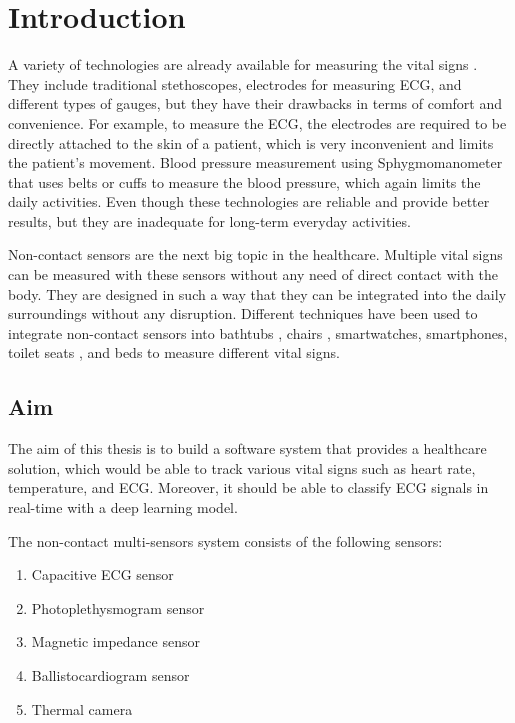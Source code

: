 \chapter{Introduction}

A variety of technologies are already available for measuring the vital signs \cite{naturectlesshcs}. They include traditional stethoscopes, electrodes for measuring ECG, and different types of gauges, but they have their drawbacks in terms of comfort and convenience. For example, to measure the ECG, the electrodes are required to be directly attached to the skin of a patient, which is very inconvenient and limits the patient's movement. Blood pressure measurement using Sphygmomanometer that uses belts or cuffs to measure the blood pressure, which again limits the daily activities. Even though these technologies are reliable and provide better results, but they are inadequate for long-term everyday activities.

Non-contact sensors are the next big topic in the healthcare. Multiple vital signs can be measured with these sensors without any need of direct contact with the body. They are designed in such a way that they can be integrated into the daily surroundings without any disruption. Different techniques have been used to integrate non-contact sensors into bathtubs \cite{lim2004ecg}, chairs \cite{aleksandrowicz2007wireless}, smartwatches, smartphones, toilet seats \cite{kim2004electrically}, and beds \cite{wu2008contactless} to measure different vital signs. 

\section{Aim}

The aim of this thesis is to build a software system that provides a healthcare solution, which would be able to track various vital signs such as heart rate, temperature, and ECG. Moreover, it should be able to classify ECG signals in real-time with a deep learning model.

The non-contact multi-sensors system consists of the following sensors:


\begin{enumerate}
	\item Capacitive ECG sensor
	\item Photoplethysmogram sensor
	\item Magnetic impedance sensor
	\item Ballistocardiogram sensor
	\item Thermal camera
\end{enumerate}


